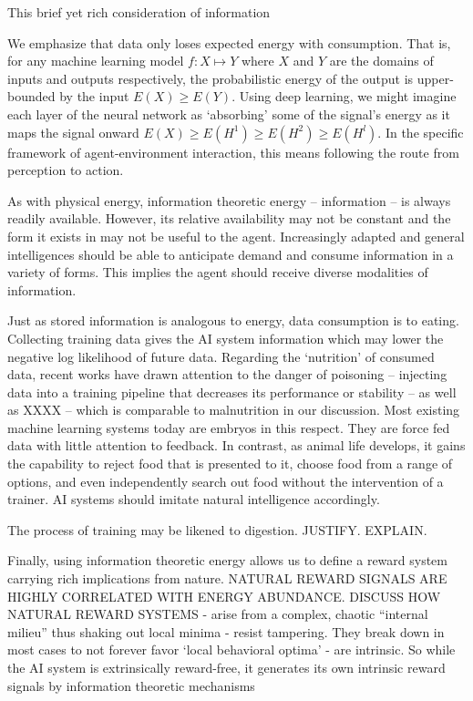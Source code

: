 This brief yet rich consideration of information

We emphasize that data only loses expected energy with consumption. That is, for any machine learning model $f \colon X \mapsto Y$ where $X$ and $Y$ are the domains of inputs and outputs respectively, the probabilistic energy of the output is upper-bounded by the input $E({X}) \ge E({Y})$. Using deep learning, we might imagine each layer of the neural network as ‘absorbing’ some of the signal’s energy as it maps the signal onward $E(X) \ge E(H^1) \ge E({H}^2) \ge E(H^l)$. In the specific framework of agent-environment interaction, this means following the route from perception to action. 

As with physical energy, information theoretic energy -- information -- is always readily available. However, its relative availability may not be constant and the form it exists in may not be useful to the agent. Increasingly adapted and general intelligences should be able to anticipate demand and consume information in a variety of forms. This implies the agent should receive diverse modalities of information.

Just as stored information is analogous to energy, data consumption is to eating. Collecting training data gives the AI system information which may lower the negative log likelihood of future data. Regarding the ‘nutrition’ of consumed data, recent works have drawn attention to the danger of poisoning -- injecting data into a training pipeline that decreases its performance or stability -- as well as XXXX -- which is comparable to malnutrition in our discussion. Most existing machine learning systems today are embryos in this respect. They are force fed data with little attention to feedback. In contrast, as animal life develops, it gains the capability to reject food that is presented to it, choose food from a range of options, and even independently search out food without the intervention of a trainer. AI systems should imitate natural intelligence accordingly.

The process of training may be likened to digestion. JUSTIFY. EXPLAIN.

Finally, using information theoretic energy allows us to define a reward system carrying rich implications from nature. NATURAL REWARD SIGNALS ARE HIGHLY CORRELATED WITH ENERGY ABUNDANCE. DISCUSS HOW NATURAL REWARD SYSTEMS
- arise from a complex, chaotic “internal milieu” thus shaking out local minima
- resist tampering. They break down in most cases to not forever favor ‘local behavioral optima’
- are intrinsic. So while the AI system is extrinsically reward-free, it generates its own intrinsic reward signals by information theoretic mechanisms

